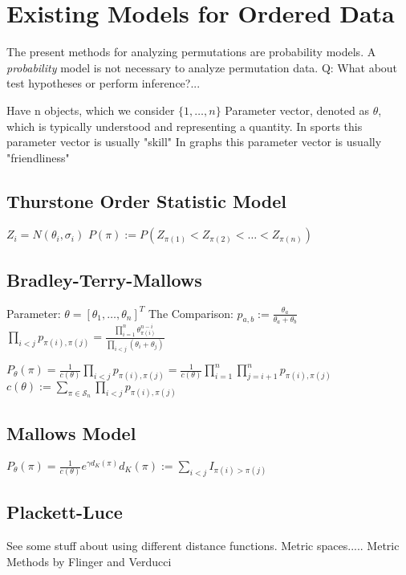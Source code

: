 \documentclass{article}
\author{Jojo Aboaf}
\date{February 2021}
\theoremstyle{definition}
\begin{document}
\section{Existing Models for Ordered Data}
The present methods for analyzing permutations are probability models. A \textit{probability} model is not necessary to analyze permutation data.
Q: What about test hypotheses or perform inference?...


Have n objects, which we consider $ \{1,\dots,n\}$
Parameter vector, denoted as $\theta$, which is typically understood and representing a quantity. 
In sports this parameter vector is usually "skill"
In graphs this parameter vector is usually "friendliness"

\subsection{Thurstone Order Statistic Model}
$ Z_i = N(\theta_i, \sigma_i) $
\( P(\pi) := P(Z_{\pi(1)} < Z_{\pi(2)} < \dots < Z_{\pi(n)} ) \)

\subsection{Bradley-Terry-Mallows}
Parameter: \(\theta = [\theta_1, \dots, \theta_n]^T\)
The Comparison: \( p_{a,b} := \frac{\theta_a}{\theta_a + \theta_b} \)
\( 
\prod_{i<j} p_{\pi(i),\pi(j)} = \frac{ \prod_{i=1}^n \theta_{\pi(i)}^{n-i} }{ \prod_{i<j}(\theta_i + \theta_j) }
\)

\(
P_\theta(\pi) = \frac{1}{ c(\theta) } \prod_{i<j}p_{\pi(i),\pi(j)} 
= \frac{1}{c(\theta)} \prod_{i=1}^n \prod_{j=i+1}^n p_{\pi(i),\pi(j)}
\)
\(c(\theta) := \sum_{\pi \in \mathcal{S}_n} \prod_{i<j} p_{\pi(i),\pi(j)}
\)

\subsection{Mallows Model}
\(
P_\theta(\pi) = \frac{1}{ c(\theta) }e^{\gamma d_K(\pi)}
d_K(\pi):= \sum_{i<j} I_{\pi(i)>\pi(j)}
\)

\subsection{Plackett-Luce}
See some stuff about using different distance functions. Metric spaces.....
Metric Methods by Flinger and Verducci
\end{document}
